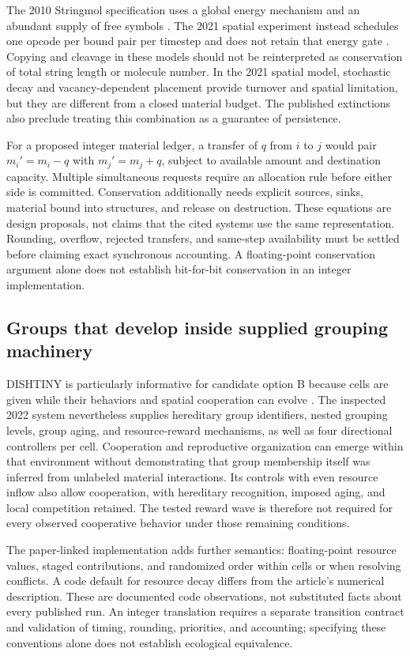 The 2010 Stringmol specification uses a global energy mechanism and an
abundant supply of free symbols \citep{StringmolSpec2010}. The 2021 spatial
experiment instead schedules one opcode per bound pair per timestep and does
not retain that energy gate \citep{Hickinbotham2021}. Copying and cleavage in
these models should not be reinterpreted as conservation of total string
length or molecule number. In the 2021 spatial model, stochastic decay and
vacancy-dependent placement provide turnover and spatial limitation, but they
are different from a closed
material budget. The published extinctions also preclude treating this
combination as a guarantee of persistence.

For a proposed integer material ledger, a transfer of $q$ from $i$ to $j$
would pair $m_i'=m_i-q$ with $m_j'=m_j+q$, subject to available amount and
destination capacity. Multiple simultaneous requests require an allocation
rule before either side is committed. Conservation additionally needs explicit
sources, sinks, material bound into structures, and release on destruction.
These equations are design proposals, not claims that the cited systems use
the same representation. Rounding, overflow, rejected transfers, and
same-step availability must be settled before claiming exact synchronous
accounting. A floating-point conservation argument alone does not establish
bit-for-bit conservation in an integer implementation.

\subsection{Groups that develop inside supplied grouping machinery}
DISHTINY is particularly informative for candidate option B because cells are
given while their behaviors and spatial cooperation can evolve
\citep{MorenoOfria2022}. The inspected 2022 system nevertheless supplies
hereditary group identifiers, nested grouping levels, group aging, and
resource-reward mechanisms, as well as four directional controllers per cell.
Cooperation and reproductive organization can
emerge within that environment without demonstrating that group membership
itself was inferred from unlabeled material interactions. Its controls with
even resource inflow also allow cooperation, with hereditary recognition,
imposed aging, and local competition retained. The tested reward wave is
therefore not required for every observed cooperative behavior under those
remaining conditions.

The paper-linked implementation adds further semantics: floating-point
resource values, staged contributions, and randomized order within cells or
when resolving conflicts. A code default for resource decay differs from the
article's numerical description. These are documented code observations,
not substituted facts about every published run. An integer translation
requires a separate transition contract and validation of timing, rounding,
priorities, and accounting; specifying these conventions alone does not
establish ecological equivalence.

